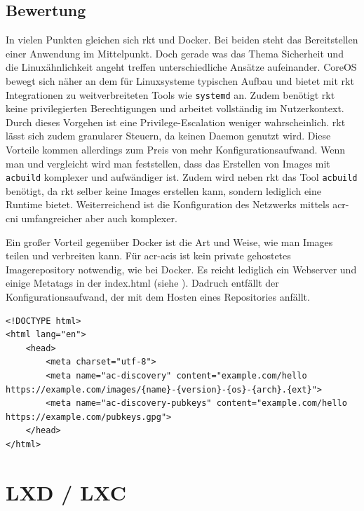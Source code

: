 \subsection{Bewertung}
\label{sec:compRktBewertung}
In vielen Punkten gleichen sich rkt und Docker. Bei beiden steht das Bereitstellen einer Anwendung im Mittelpunkt. Doch gerade was das Thema Sicherheit und die Linuxähnlichkeit angeht treffen unterschiedliche Ansätze aufeinander. CoreOS bewegt sich näher an dem für Linuxsysteme typischen Aufbau und bietet mit rkt Integrationen zu weitverbreiteten Tools wie \texttt{systemd} an. Zudem benötigt rkt keine privilegierten Berechtigungen und arbeitet vollständig im Nutzerkontext. Durch dieses Vorgehen ist eine Privilege-Escalation weniger wahrscheinlich. rkt lässt sich zudem granularer Steuern, da keinen Daemon genutzt wird. Diese Vorteile kommen allerdings zum Preis von mehr Konfigurationsaufwand. Wenn man  und  vergleicht wird man feststellen, dass das Erstellen von Images mit \texttt{acbuild} komplexer und aufwändiger ist. Zudem wird neben rkt das Tool \texttt{acbuild} benötigt, da rkt selber keine Images erstellen kann, sondern lediglich eine Runtime bietet. Weiterreichend ist die Konfiguration des Netzwerks mittels \gls{acr-cni} umfangreicher aber auch komplexer.

Ein großer Vorteil gegenüber Docker ist die Art und Weise, wie man Images teilen und verbreiten kann. Für \glspl{acr-aci} ist kein private gehostetes Imagerepository notwendig, wie bei Docker. Es reicht lediglich ein Webserver und einige Metatags in der index.html (siehe ). Dadruch entfällt der Konfigurationsaufwand, der mit dem Hosten eines Repositories anfällt.

\begin{listing}
	\begin{verbatim}
<!DOCTYPE html>
<html lang="en">
	<head>
		<meta charset="utf-8">
		<meta name="ac-discovery" content="example.com/hello https://example.com/images/{name}-{version}-{os}-{arch}.{ext}">
		<meta name="ac-discovery-pubkeys" content="example.com/hello https://example.com/pubkeys.gpg">
	</head>
</html>
	\end{verbatim}
	\caption{index.html mit Metatags um \glspl{acr-aci} bereitzustellen}
	\label{lst:rktReposHTML}
\end{listing}

\pagebreak

\section{LXD / LXC}
\label{sec:compLXD}

